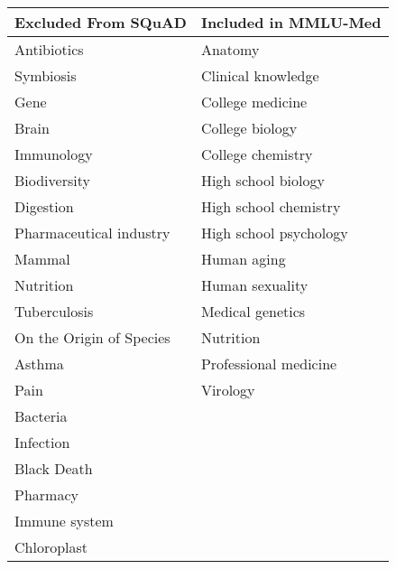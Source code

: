 \begin{tabular}{l|l}
\toprule
\textbf{Excluded From SQuAD} & \textbf{Included in MMLU-Med} \\
\midrule
Antibiotics           & Anatomy                    \\
Symbiosis             & Clinical knowledge         \\
Gene                  & College medicine           \\
Brain                 & College biology            \\
Immunology            & College chemistry          \\
Biodiversity          & High school biology        \\
Digestion             & High school chemistry      \\
Pharmaceutical industry & High school psychology    \\
Mammal                & Human aging                \\
Nutrition             & Human sexuality            \\
Tuberculosis          & Medical genetics           \\
On the Origin of Species & Nutrition               \\
Asthma                & Professional medicine      \\
Pain                  & Virology                   \\
Bacteria              &                            \\
Infection             &                            \\
Black Death           &                            \\
Pharmacy              &                            \\
Immune system         &                            \\
Chloroplast           &                            \\
\bottomrule
\end{tabular}
